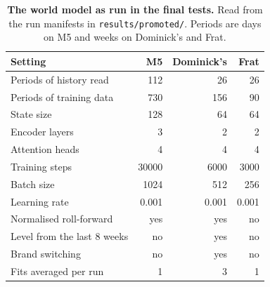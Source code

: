 \begin{table}[t]
\centering
\caption{\textbf{The world model as run in the final tests.} Read from the run manifests in
\texttt{results/promoted/}. Periods are days on M5 and weeks on Dominick's and Frat.}
\label{tab:settings}
\footnotesize
\begin{tabular}{lrrr}
\toprule
\textbf{Setting} & \textbf{M5} & \textbf{Dominick's} & \textbf{Frat} \\
\midrule
Periods of history read & 112 & 26 & 26 \\
Periods of training data & 730 & 156 & 90 \\
State size & 128 & 64 & 64 \\
Encoder layers & 3 & 2 & 2 \\
Attention heads & 4 & 4 & 4 \\
Training steps & 30000 & 6000 & 3000 \\
Batch size & 1024 & 512 & 256 \\
Learning rate & 0.001 & 0.001 & 0.001 \\
Normalised roll-forward & yes & yes & no \\
Level from the last 8 weeks & no & yes & no \\
Brand switching & no & yes & no \\
Fits averaged per run & 1 & 3 & 1 \\
\bottomrule
\end{tabular}
\end{table}
